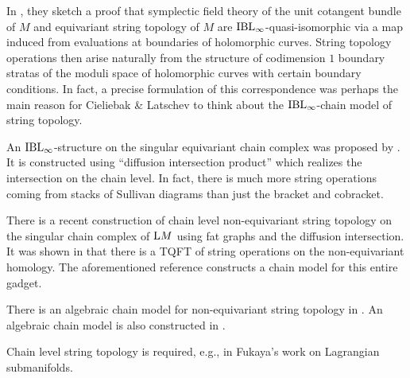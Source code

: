 \documentclass[\MainFolder/Text.tex]{subfiles}
\begin{document}
In \cite{Cieliebak2007}, they sketch a proof that symplectic field theory of the unit cotangent bundle of $M$ and equivariant string topology of $M$ are $\mathrm{IBL}_\infty$-quasi-isomorphic via a map induced from evaluations at boundaries of holomorphic curves. String topology operations then arise naturally from the structure of codimension $1$ boundary stratas of the moduli space of holomorphic curves with certain boundary conditions. In fact, a precise formulation of this correspondence was perhaps the main reason for Cieliebak \& Latschev to think about the $\mathrm{IBL}_\infty$-chain model of string topology.

An $\mathrm{IBL}_\infty$-structure on the singular equivariant chain complex was proposed by \cite{Sullivan2005}. It is constructed using ``diffusion intersection product'' which realizes the intersection on the chain level. In fact, there is much more string operations coming from stacks of Sullivan diagrams than just the bracket and cobracket.

There is a recent construction of chain level non-equivariant string topology on the singular chain complex of $\mathrm{L} M$ using fat graphs \cite{DrummondCole2015} and the diffusion intersection. It was shown in \cite{Cohen2006} that there is a TQFT of string operations on the non-equivariant homology. The aforementioned reference constructs a chain model for this entire gadget. 

There is an algebraic chain model for non-equivariant string topology in \cite{Chen2012}. An algebraic chain model is also constructed in \cite{Irie2014}. 

Chain level string topology is required, e.g., in Fukaya's work on Lagrangian submanifolds.

%
%
\end{document}
